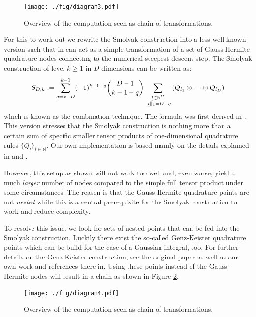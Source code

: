 \documentclass[a4paper,10pt]{article}
\begin{document}
\begin{figure}[h!]
  \centering
  \texttt{[image: ./fig/diagram3.pdf]}
  \caption{Overview of the computation seen as chain of transformations.}
  \label{fig:transformation_chain_3}
\end{figure}

For this to work out we rewrite the Smolyak construction into a less well known
version such that in can act as a simple transformation of a set of Gauss-Hermite
quadrature nodes connecting to the numerical steepest descent step. The Smolyak
construction of level $k \geq 1$ in $D$ dimensions can be written as:
\begin{equation*}
  S_{D,k} := \sum_{q=k-D}^{k-1} (-1)^{k-1-q} \binom{D-1}{k-1-q}
                  \sum_{\substack{\underline{l} \in \mathbb{N}^D \\
                                  \|\underline{l}\|_1 = D+q}}
                  \left(Q_{l_1} \otimes \cdots \otimes Q_{l_D}\right)
\end{equation*}
which is known as the combination technique. The formula was first derived in
\cite{Wasilkowski_Wozniakowski_95}. This version stresses that the Smolyak
construction is nothing more than a certain sum of specific smaller tensor
products of one-dimensional quadrature rules $\{Q_i\}_{i \in\mathbb{N}}$.
Our own implementation is based mainly on the details explained in
\cite{Heiss_Winschel_08} and \cite{Gerstner_Griebel_98}.

However, this setup as shown will not work too well and, even worse, yield
a much \emph{larger} number of nodes compared to the simple full tensor
product under some circumstances. The reason is that the Gauss-Hermite
quadrature points are not \emph{nested} while this is a central prerequisite
for the Smolyak construction to work and reduce complexity.

To resolve this issue, we look for sets of nested points that can be fed
into the Smolyak construction. Luckily there exist the so-called Genz-Keister
quadrature points which can be build for the case of a Gaussian integral, too.
For further details on the Genz-Keister construction, see the original paper
\cite{genz_keister} as well as our own work \cite{B_kes} and references there in.
Using these points instead of the Gauss-Hermite nodes will result in a chain
as shown in Figure \ref{fig:transformation_chain_4}.

\begin{figure}[h!]
  \centering
  \texttt{[image: ./fig/diagram4.pdf]}
  \caption{Overview of the computation seen as chain of transformations.}
  \label{fig:transformation_chain_4}
\end{figure}
\end{document}
